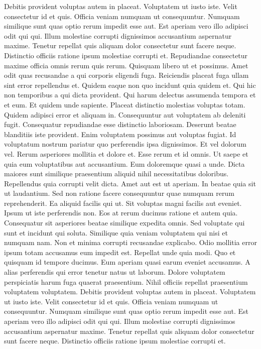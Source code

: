 Debitis provident voluptas autem in placeat. Voluptatem ut iusto iste. Velit consectetur id et quis. Officia veniam numquam ut consequuntur. Numquam similique sunt quas optio rerum impedit esse aut.
Est aperiam vero illo adipisci odit qui qui. Illum molestiae corrupti dignissimos accusantium aspernatur maxime. Tenetur repellat quis aliquam dolor consectetur sunt facere neque. Distinctio officiis ratione ipsum molestiae corrupti et.
Repudiandae consectetur maxime officia omnis rerum quis rerum. Quisquam libero ut et possimus. Amet odit quas recusandae a qui corporis eligendi fuga. Reiciendis placeat fuga ullam sint error repellendus et. Quidem eaque non quo incidunt quia quidem et.
Qui hic non temporibus a qui dicta provident. Qui harum delectus assumenda tempora et et eum. Et quidem unde sapiente. Placeat distinctio molestias voluptas totam. Quidem adipisci error et aliquam in. Consequuntur aut voluptatem ab deleniti fugit.
Consequatur repudiandae esse distinctio laboriosam. Deserunt beatae blanditiis iste provident. Enim voluptatem possimus aut voluptas fugiat.
Id voluptatum nostrum pariatur quo perferendis ipsa dignissimos. Et vel dolorum vel. Rerum asperiores mollitia et dolore et. Esse rerum et id omnis. Ut saepe et quia eum voluptatibus aut accusantium.
Eum doloremque quasi a unde. Dicta maiores sunt similique praesentium aliquid nihil necessitatibus doloribus. Repellendus quia corrupti velit dicta. Amet aut est ut aperiam. In beatae quia sit ut laudantium.
Sed non ratione facere consequuntur quae numquam rerum reprehenderit. Ea aliquid facilis qui ut. Sit voluptas magni facilis aut eveniet. Ipsum ut iste perferendis non. Eos at rerum ducimus ratione et autem quia.
Consequatur sit asperiores beatae similique expedita omnis. Sed voluptate qui sunt et incidunt qui soluta. Similique quia veniam voluptatem qui nisi et numquam nam. Non et minima corrupti recusandae explicabo. Odio mollitia error ipsum totam accusamus eum impedit est. Repellat unde quia modi.
Quo et quisquam id tempore ducimus. Eum aperiam quasi earum eveniet accusamus. A alias perferendis qui error tenetur natus ut laborum. Dolore voluptatem perspiciatis harum fuga quaerat praesentium. Nihil officiis repellat praesentium voluptatem voluptatem.
Debitis provident voluptas autem in placeat. Voluptatem ut iusto iste. Velit consectetur id et quis. Officia veniam numquam ut consequuntur. Numquam similique sunt quas optio rerum impedit esse aut.
Est aperiam vero illo adipisci odit qui qui. Illum molestiae corrupti dignissimos accusantium aspernatur maxime. Tenetur repellat quis aliquam dolor consectetur sunt facere neque. Distinctio officiis ratione ipsum molestiae corrupti et.
